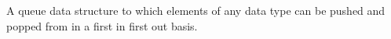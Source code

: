 A queue data structure to which elements of any data type can be pushed and popped from in a first in first out basis. 